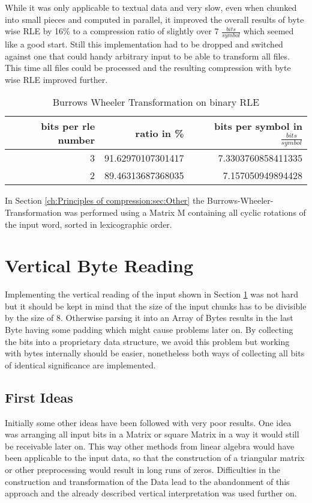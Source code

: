 \par{
While it was only applicable to textual data and very slow, even when chunked into small pieces and computed in parallel, it improved the overall results of byte wise RLE by 16\% to a compression ratio of slightly over 7 $\frac{bits}{symbol}$ which seemed like a good start. Still this implementation had to be dropped and switched against one that could handy arbitrary input to be able to transform all files. This time all files could be processed and the resulting compression with byte wise RLE improved further.

\begin{table}[h]
	\centering
	\begin{tabular}{r|r|r}	
		bits per rle number & ratio in \% & bits per symbol in $\frac{bits}{symbol}$\\
		\hline
		3 & 91.62970107301417 & 7.3303760858411335\\
		2 & 89.46313687368035 & 7.157050949894428
	\end{tabular}
	\caption{Burrows Wheeler Transformation on binary RLE}
	\label{tab:t12 Burrows Wheeler Transformation on binary RLE}
\end{table}
}
\par{
In Section \ref{ch:Principles of compression:sec:Other} the Burrows-Wheeler-Transformation was performed using a Matrix M containing all cyclic rotations of the input word, sorted in lexicographic order. 
}

\section{Vertical Byte Reading}
\label{ch:Conceptual Design:sec:Parallel Byte Reading}

Implementing the vertical reading of the input shown in Section \ref*{ch:Conceptual Design:sec:Parallel Byte Reading} was not hard but it should be kept in mind that the size of the input chunks has to be divisible by the size of 8. Otherwise parsing it into an Array of Bytes results in the last Byte having some padding which might cause problems later on. By collecting the bits into a proprietary data structure, we avoid this problem but working with bytes internally should be easier, nonetheless both ways of collecting all bits of identical significance are implemented.

\subsection{First Ideas}
Initially some other ideas have been followed with very poor results. One idea was arranging all input bits in a Matrix or square Matrix in a way it would still be receivable later on. This way other methods from linear algebra would have been applicable to the input data, so that the construction of a triangular matrix or other preprocessing would result in long runs of zeros. Difficulties in the construction and transformation of the Data lead to the abandonment of this approach and the already described vertical interpretation was used further on.

